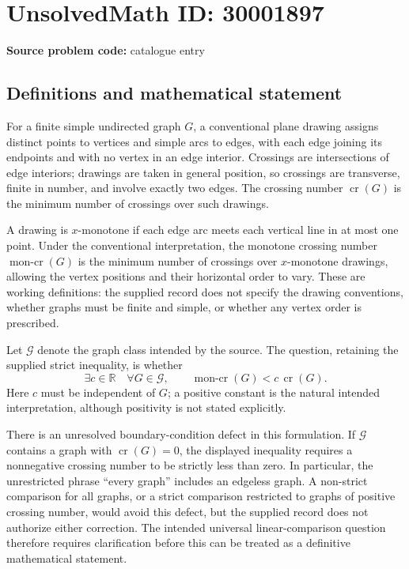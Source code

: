 \documentclass[11pt]{article}
\newcommand{\R}{\mathbb{R}}
\begin{document}
\section*{UnsolvedMath ID: 30001897}
\textbf{Source problem code:} catalogue entry
\subsection{Definitions and mathematical statement}
For a finite simple undirected graph \(G\), a conventional plane drawing assigns distinct points to vertices and simple arcs to edges, with each edge joining its endpoints and with no vertex in an edge interior. Crossings are intersections of edge interiors; drawings are taken in general position, so crossings are transverse, finite in number, and involve exactly two edges. The crossing number \(\operatorname{cr}(G)\) is the minimum number of crossings over such drawings.

A drawing is \(x\)-monotone if each edge arc meets each vertical line in at most one point. Under the conventional interpretation, the monotone crossing number \(\operatorname{mon\text{-}cr}(G)\) is the minimum number of crossings over \(x\)-monotone drawings, allowing the vertex positions and their horizontal order to vary. These are working definitions: the supplied record does not specify the drawing conventions, whether graphs must be finite and simple, or whether any vertex order is prescribed.

Let \(\mathcal G\) denote the graph class intended by the source. The question, retaining the supplied strict inequality, is whether
\[
\exists c\in\R\quad\forall G\in\mathcal G,\qquad
\operatorname{mon\text{-}cr}(G)<c\,\operatorname{cr}(G).
\]
Here \(c\) must be independent of \(G\); a positive constant is the natural intended interpretation, although positivity is not stated explicitly.

There is an unresolved boundary-condition defect in this formulation. If \(\mathcal G\) contains a graph with \(\operatorname{cr}(G)=0\), the displayed inequality requires a nonnegative crossing number to be strictly less than zero. In particular, the unrestricted phrase ``every graph'' includes an edgeless graph. A non-strict comparison for all graphs, or a strict comparison restricted to graphs of positive crossing number, would avoid this defect, but the supplied record does not authorize either correction. The intended universal linear-comparison question therefore requires clarification before this can be treated as a definitive mathematical statement.
\end{document}

